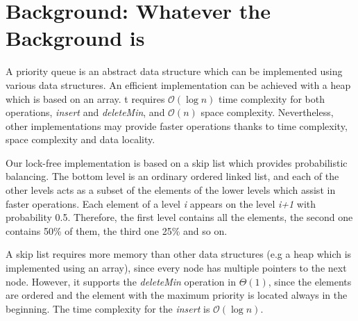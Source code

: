 \section{Background: Whatever the Background is}\label{sec:background}

A priority queue is an abstract data structure which can be implemented using various data structures.
An efficient implementation can be achieved with a heap which is based on an array.
t requires $\mathcal{O}(\log{}n)$ time complexity for both operations, \textit{insert} and \textit{deleteMin}, and $\mathcal{O}(n)$ space complexity.
Nevertheless, other implementations may provide faster operations thanks to time complexity, space complexity and data locality.

Our lock-free implementation is based on a skip list which provides probabilistic balancing.
The bottom level is an ordinary ordered linked list, and each of the other levels acts as a subset of the elements of the lower levels which assist in faster operations.
Each element of a level \textit{i} appears on the level \textit{i+1} with probability 0.5.
Therefore, the first level contains all the elements, the second one contains 50\% of them, the third one 25\% and so on.

A skip list requires more memory than other data structures (e.g a heap which is implemented using an array), since every node has multiple pointers to the next node.
However, it supports the \textit{deleteMin} operation in $\Theta(1)$, since the elements are ordered and the element with the maximum priority is located always in the beginning.
The time complexity for the \textit{insert} is $\mathcal{O}(\log{}n)$.






